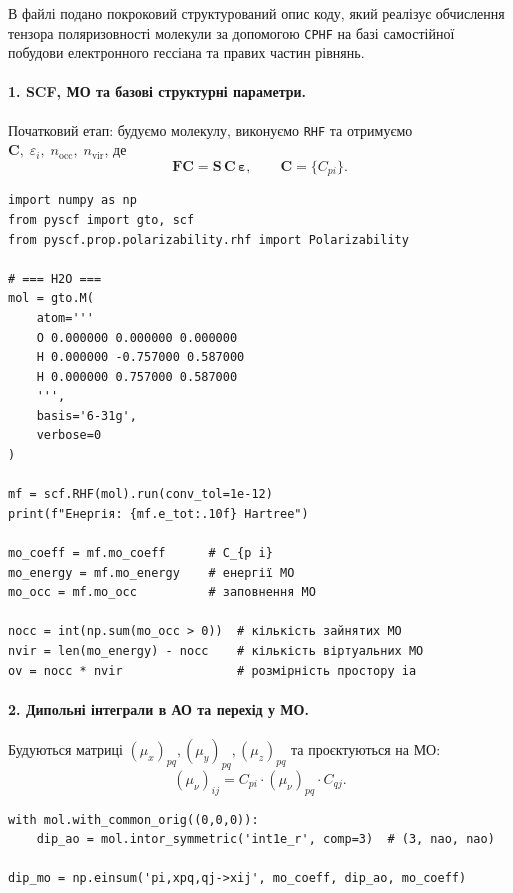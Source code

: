 \documentclass{PySCFBook}
\begin{document}
В файлі  подано покроковий структурований опис коду, який реалізує обчислення тензора
поляризовності молекули  за допомогою \texttt{CPHF} на базі самостійної побудови
електронного гессіана та правих частин рівнянь.

\paragraph{1. SCF, МО та базові структурні параметри.}

Початковий етап: будуємо молекулу, виконуємо \texttt{RHF} та отримуємо
\(
 \mathbf C,\;
 \varepsilon_i,\;
 n_{\text{occ}},\;
 n_{\text{vir}}
\),
де
\[
\mathbf F \mathbf C = \mathbf S\,\mathbf C\,\boldsymbol\varepsilon ,\qquad
\mathbf C=\{C_{pi}\}.
\]

\begin{verbatim}
import numpy as np
from pyscf import gto, scf
from pyscf.prop.polarizability.rhf import Polarizability

# === H2O ===
mol = gto.M(
    atom='''
    O 0.000000 0.000000 0.000000
    H 0.000000 -0.757000 0.587000
    H 0.000000 0.757000 0.587000
    ''',
    basis='6-31g',
    verbose=0
)

mf = scf.RHF(mol).run(conv_tol=1e-12)
print(f"Енергія: {mf.e_tot:.10f} Hartree")

mo_coeff = mf.mo_coeff      # C_{p i}
mo_energy = mf.mo_energy    # енергії МО
mo_occ = mf.mo_occ          # заповнення МО

nocc = int(np.sum(mo_occ > 0))  # кількість зайнятих МО
nvir = len(mo_energy) - nocc    # кількість віртуальних МО
ov = nocc * nvir                # розмірність простору ia
\end{verbatim}

\paragraph{2. Дипольні інтеграли в АО та перехід у МО.}

Будуються матриці
\( (\mu_x)_{pq}, (\mu_y)_{pq}, (\mu_z)_{pq}\)
та проєктуються на МО:
\[
(\mu_{\nu})_{ij} = C_{pi}\cdot (\mu_\nu)_{pq}\cdot C_{qj}.
\]

\begin{verbatim}
with mol.with_common_orig((0,0,0)):
    dip_ao = mol.intor_symmetric('int1e_r', comp=3)  # (3, nao, nao)

dip_mo = np.einsum('pi,xpq,qj->xij', mo_coeff, dip_ao, mo_coeff)
\end{verbatim}
\end{document}

